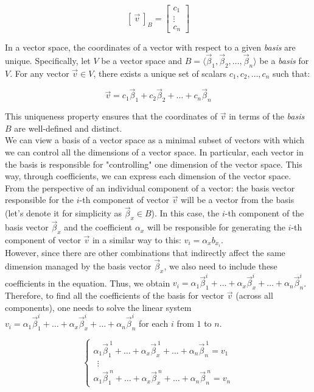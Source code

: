 $$
[ \ \vec v \ ]_B =\begin{bmatrix}
    c_1 \\
    \vdots\\
    c_n
\end{bmatrix}
$$



In a vector space, the coordinates of a vector with respect to a given \emph{basis} are unique. Specifically, let $V$ be a vector space and $B = \langle \vec{\beta}_1, \vec{\beta}_2, \ldots, \vec{\beta}_n\rangle$ be a \emph{basis} for $V$. For any vector $\vec{v} \in V$, there exists a unique set of scalars $c_1, c_2, \ldots, c_n$ such that:

$$
\vec{v} = c_1 \vec{\beta}_1 + c_2 \vec{\beta}_2 + \ldots + c_n \vec{\beta}_n
$$

This uniqueness property ensures that the coordinates of $\vec{v}$ in terms of the \emph{basis} $B$ are well-defined and distinct.
\\

We can view a basis of a vector space as a minimal subset of vectors with which we can control all the dimensions of a vector space. In particular, each vector in the basis is responsible for "controlling" one dimension of the vector space. This way, through coefficients, we can express each dimension of the vector space. From the perspective of an individual component of a vector: the basis vector responsible for the $i$-th component of vector $\vec{v}$ will be a vector from the basis (let's denote it for simplicity as $\vec{\beta}_x \in B$). In this case, the $i$-th component of the basis vector $\vec{\beta}_x$ and the coefficient $\alpha_x$ will be responsible for generating the $i$-th component of vector $\vec{v}$ in a similar way to this: $v_i = \alpha_x b_{x_i}$.
\\

However, since there are other combinations that indirectly affect the same dimension managed by the basis vector $\vec{\beta}_x$, we also need to include these coefficients in the equation. Thus, we obtain $v_i = \alpha_1 \vec\beta^i_{1} + \ldots + \alpha_x \vec{\beta}^i_{x} + \ldots + \alpha_n \vec{\beta}^i_{n}$. Therefore, to find all the coefficients of the basis for vector $\vec{v}$ (across all components), one needs to solve the linear system $v_i = \alpha_1 \vec{\beta}^i_{1} + \ldots + \alpha_x \vec{\beta}^i_{x} + \ldots + \alpha_n \vec{\beta}^i_{n}$ for each $i$ from $1$ to $n$.

$$
\begin{cases}
\alpha_1 \vec{\beta}^{\ 1}_{1} + \ldots + \alpha_x \vec{\beta}^{\ 1}_{x} + \ldots + \alpha_n \vec{\beta}^{\ 1}_{n} = v_1 \\
\ \ \vdots\\
\alpha_1 \vec{\beta}^{\ n}_{1} + \ldots + \alpha_x \vec{\beta}^{\ n}_{x} + \ldots + \alpha_n \vec{\beta}^{\ n}_{n} = v_n
\end{cases}
$$

